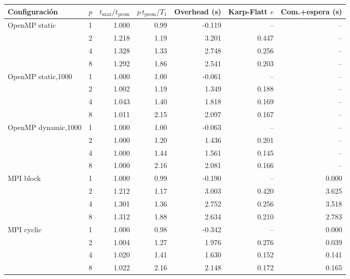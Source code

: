 \begin{tabular}{lrrrrrr}
\toprule
Configuraci\'on & $p$ & $t_{\max}/t_{\mathrm{prom}}$ & $p\,t_{\mathrm{prom}}/T_1$ & Overhead (s) & Karp-Flatt $e$ & Com.+espera (s) \\
\midrule
OpenMP static & 1 & 1.000 & 0.99 & -0.119 & -- & -- \\
 & 2 & 1.218 & 1.19 & 3.201 & 0.447 & -- \\
 & 4 & 1.328 & 1.33 & 2.748 & 0.256 & -- \\
 & 8 & 1.292 & 1.86 & 2.541 & 0.203 & -- \\
\midrule
OpenMP static,1000 & 1 & 1.000 & 1.00 & -0.061 & -- & -- \\
 & 2 & 1.002 & 1.19 & 1.349 & 0.188 & -- \\
 & 4 & 1.043 & 1.40 & 1.818 & 0.169 & -- \\
 & 8 & 1.011 & 2.15 & 2.097 & 0.167 & -- \\
\midrule
OpenMP dynamic,1000 & 1 & 1.000 & 1.00 & -0.063 & -- & -- \\
 & 2 & 1.000 & 1.20 & 1.436 & 0.201 & -- \\
 & 4 & 1.000 & 1.44 & 1.561 & 0.145 & -- \\
 & 8 & 1.000 & 2.16 & 2.081 & 0.166 & -- \\
\midrule
MPI block & 1 & 1.000 & 0.99 & -0.190 & -- & 0.000 \\
 & 2 & 1.212 & 1.17 & 3.003 & 0.420 & 3.625 \\
 & 4 & 1.301 & 1.36 & 2.752 & 0.256 & 3.518 \\
 & 8 & 1.312 & 1.88 & 2.634 & 0.210 & 2.783 \\
\midrule
MPI cyclic & 1 & 1.000 & 0.98 & -0.342 & -- & 0.000 \\
 & 2 & 1.004 & 1.27 & 1.976 & 0.276 & 0.039 \\
 & 4 & 1.020 & 1.41 & 1.630 & 0.152 & 0.141 \\
 & 8 & 1.022 & 2.16 & 2.148 & 0.172 & 0.165 \\
\bottomrule
\end{tabular}